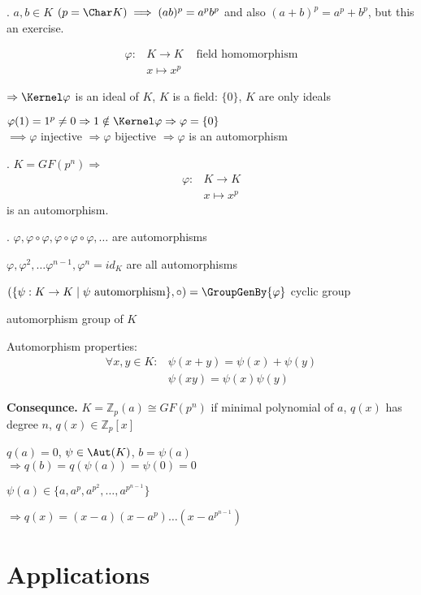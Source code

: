 \Lemma.
$a,b \in K$ $(p= \Char K) \implies (ab)^p = a^p b^p$ and also $(a+b)^p = a^p + b^p$, but this an exercise. 

\begin{align*}
  \varphi : &K \rightarrow K & \text{ field homomorphism}\\
    & x \mapsto x^p
\end{align*}

$\Rightarrow \Kernel \varphi$ is an ideal of $K$, $K$ is a field: $\{0\}$, $K$ are only ideals

$\varphi(1) = 1^p \neq 0 \Rightarrow 1 \notin \Kernel \varphi \Rightarrow \varphi = \{0\}$\\
$\implies \varphi$ injective $\Rightarrow \varphi$ bijective $\Rightarrow \varphi$ is an automorphism

\Theorem.
$K = GF(p^n) \Rightarrow $
\begin{align*}
  \varphi : &K \rightarrow K \\
    & x \mapsto x^p
\end{align*}
is an automorphism.

\Remark.
$\varphi, \varphi\circ \varphi, \varphi\circ\varphi\circ\varphi, \ldots$ are automorphisms

$\varphi, \varphi^2, \ldots \varphi^{n-1}, \varphi^n = id_K$ are all automorphisms

$( \{\psi: K \rightarrow K \mid \psi \text{ automorphism}\}, \circ ) = \GroupGenBy{\varphi}$ cyclic group 

automorphism group of $K$

Automorphism properties:
\begin{align*}
  \forall x,y \in K:
    & \psi(x+y) = \psi(x) + \psi(y)\\
    & \psi(xy) = \psi(x)\psi(y)
\end{align*}

\textbf{Consequnce.}
$K = \mathbb{Z}_p(a) \cong GF(p^n)$ if minimal polynomial of $a$, $q(x)$ has degree $n$, $q(x) \in \mathbb{Z}_p[x]$

$q(a) = 0$, $\psi \in \Aut(K)$, $b = \psi(a)$\\
$\Rightarrow q(b) = q(\psi(a)) = \psi(0) = 0$

$\psi(a) \in \{a, a^p, a^{p^2}, \ldots, a^{p^{n-1}} \}$

$\Rightarrow q(x) = (x-a)(x-a^p) \ldots (x-a^{p^{n-1}})$

\section{Applications}
